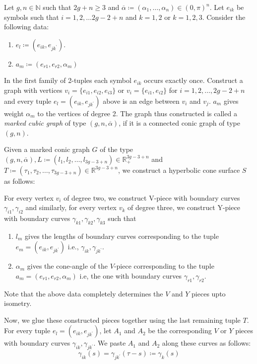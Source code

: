 \begin{defn}
	Let $g,n \in \mathbb{N}$ such that $2g+n \geq 3$ and $\overline{\alpha}\coloneqq (\alpha_1, \ldots, \alpha_n) \in (0,\pi)^n$. Let $e_{ik}$ be symbols such that $i = 1,2, \ldots 2g-2+n$ and $k= 1,2$ or $k = 1,2,3$. Consider the following data:
	\begin{enumerate}
		\item $e_l \coloneqq (e_{ik},e_{jk^\prime})$.
		\item $a_m \coloneqq (e_{r1}, e_{r2}, \alpha_m)$ 
	\end{enumerate}
	In the first family of 2-tuples each symbol $e_{ik}$ occurs exactly once. Construct a graph with vertices $v_i = \{e_{i1},e_{i2},e_{i3}\}$ or $v_i=\{e_{i1},e_{i2}\}$ for $i = 1,2, \ldots, 2g-2+n$ and every tuple $e_l =(e_{ik}, e_{jk^\prime})$ above is an edge between $v_i$ and $v_j$. $a_m$ gives weight $\alpha_m$ to the vertices of degree 2. The graph thus constructed is called a \textit{marked cubic graph} of type $(g,n,\overline{\alpha})$, if it is a connected conic graph of type $(g,n)$.
\end{defn}

Given a marked conic graph $G$ of the type $(g,n,\overline{\alpha}), L \coloneqq (l_1,l_2,\ldots,l_{3g-3+n})\in \mathbb{R}^{3g-3+n}_+$ and $ T \coloneqq (\tau_1,\tau_2,\ldots,\tau_{3g-3+n}) \in \mathbb{R}^{3g-3+n}$, we construct a hyperbolic cone surface $S$ as follows:

For every vertex $v_i$ of degree two, we construct V-piece with boundary curves $\gamma_{i1},\gamma_{i2}$ and similarly, for every vertex $v_k$ of degree three, we construct Y-piece with boundary curves $\gamma_{k1},\gamma_{k2},\gamma_{k3}$ such that 
\begin{enumerate}
	\item $l_m$ gives the lengths of boundary curves corresponding to the tuple $e_m = (e_{ik},e_{jk^\prime})$ i.e., $\gamma_{ik},\gamma_{jk^\prime}$.
	\item $\alpha_m$ gives the cone-angle of the $V$-piece corresponding to the tuple $a_m =(e_{r1},e_{r2}, \alpha_m)$ i.e, the one with boundary curves $\gamma_{r1}, \gamma_{r2}$.   
\end{enumerate} 
Note that the above data completely determines the $V$ and $Y$ pieces upto isometry. 

Now, we glue these constructed pieces together using the last remaining tuple $T$. For every tuple $e_l = (e_{ik}, e_{jk^\prime})$, let $A_1$ and $A_2$ be the corresponding $V$ or $Y$ pieces with boundary curves $\gamma_{ik}, \gamma_{jk^\prime}$. We paste $A_1$ and $A_2$ along these curves as follows:
\[\gamma_{ik}(s)= \gamma_{jk^\prime}(\tau - s) \coloneqq \gamma_{k}(s)\]

